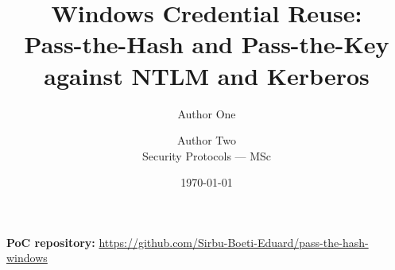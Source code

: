 \documentclass[11pt,a4paper]{article}
\title{\bfseries Windows Credential Reuse:\\[0.3em]
       Pass-the-Hash and Pass-the-Key\\[0.15em]
       against NTLM and Kerberos}
\author{Author One \and Author Two\\[0.4em]
        \small Security Protocols --- MSc}
\date{\today}
\begin{document}
\maketitle

\begin{flushleft}
\small\textbf{PoC repository:} \url{https://github.com/Sirbu-Boeti-Eduard/pass-the-hash-windows}
\end{flushleft}














\printbibliography[heading=bibintoc,title={References}]

\appendix

\end{document}
